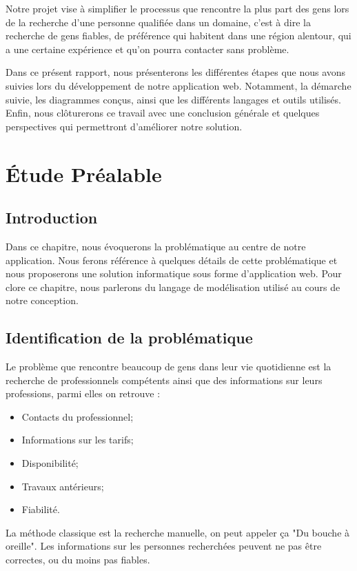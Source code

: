 \documentclass[french]{report}
\begin{document}
Notre projet vise à simplifier le processus que rencontre la plus part des gens lors de la recherche
d’une personne qualifiée dans un domaine, c’est à dire la recherche de gens fiables, de préférence
qui habitent dans une région alentour, qui a une certaine expérience et qu’on pourra contacter sans problème.

Dans ce présent rapport, nous présenterons les différentes étapes que nous avons suivies lors du
développement de notre application web. Notamment, la démarche suivie, les diagrammes conçus,
ainsi que les différents langages et outils utilisés. Enfin, nous clôturerons ce travail avec 
une conclusion générale et quelques perspectives qui permettront d'améliorer notre solution.



\chapter{Étude Préalable}

\section{Introduction}
Dans ce chapitre, nous évoquerons la problématique au centre de notre application.
Nous ferons référence à quelques détails de cette problématique et nous proposerons
une solution informatique sous forme d’application web. Pour clore ce chapitre,
nous parlerons du langage de modélisation utilisé au cours de notre conception. 

\section{Identification de la problématique}
Le problème que rencontre beaucoup de gens dans leur vie quotidienne est la recherche
de professionnels compétents ainsi que des informations sur leurs professions, parmi elles on retrouve : 

	\begin{itemize}
	    \item Contacts du professionnel;
	    \item Informations sur les tarifs;
	    \item Disponibilité; 
	    \item Travaux antérieurs;
	    \item Fiabilité. 
	\end{itemize}

La méthode classique est la recherche manuelle, on peut appeler ça "Du bouche à oreille".
Les informations sur les personnes recherchées peuvent ne pas être correctes, ou du moins pas fiables. 
\end{document}
